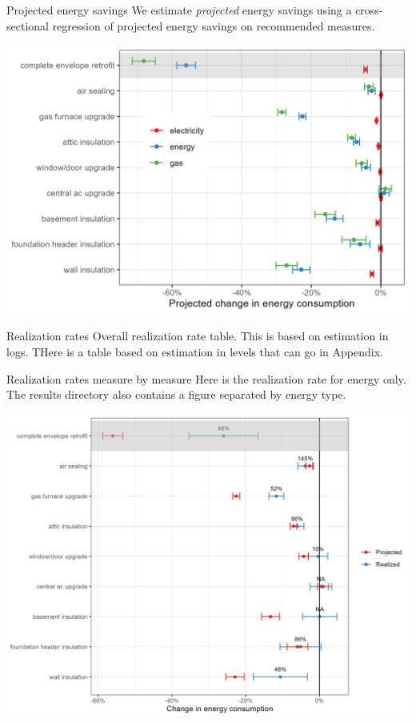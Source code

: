\documentclass[8pt]{beamer}
\begin{document}
\begin{frame}{Projected energy savings}
	We estimate \textit{projected} energy savings using a cross-sectional regression of projected energy savings on recommended measures.
	
		\includegraphics[width=\linewidth]{../output_figures_tables/projected_es_mbm}
\end{frame}

\begin{frame}{Realization rates}
	Overall realization rate table. This is based on estimation in logs. THere is a table based on estimation in levels that can go in Appendix.
	
	
\end{frame}

\begin{frame}{Realization rates measure by measure}
	Here is the realization rate for energy only. The results directory also contains a figure separated by energy type.
	
	\includegraphics[width=\linewidth]{../output_figures_tables/mbm_realization_rate_all_energy}
\end{frame}
\end{document}
